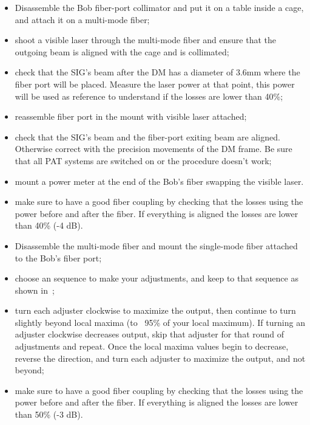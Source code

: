 \begin{itemize}
  \item Disassemble the Bob fiber-port collimator and put it on a table inside a cage, and attach it on a multi-mode fiber;
  \item shoot a visible laser through the multi-mode fiber and ensure that the outgoing beam is aligned with the cage and is collimated;
  \item check that the SIG's beam after the DM has a diameter of 3.6mm where the fiber port will be placed. Measure the laser power at that point, this power will be used as reference to understand if the losses are lower than 40\%;
  \item reassemble fiber port in the mount with visible laser attached;
  \item check that the SIG's beam and the fiber-port exiting beam are aligned. Otherwise correct with the precision movements of the DM frame. Be sure that all PAT systems are switched on or the procedure doesn't work;
  \item mount a power meter at the end of the Bob's fiber swapping the visible laser.
  \item make sure to have a good fiber coupling by checking that the losses using the power before and after the fiber. If everything is aligned the losses are lower than 40\% (-4 dB).
\end{itemize}

\begin{itemize}
  \item Disassemble the multi-mode fiber and mount the single-mode fiber attached to the Bob's fiber port;
  \item choose an sequence to make your adjustments, and keep to that sequence as shown in~;
  \item turn each adjuster clockwise to maximize the output, then continue to turn slightly beyond local maxima (to ~95\% of your local maximum). If turning an adjuster clockwise decreases output, skip that adjuster for that round of adjustments and repeat. Once the local maxima values begin to decrease, reverse the direction, and turn each adjuster to maximize the output, and not beyond;
  \item make sure to have a good fiber coupling by checking that the losses using the power before and after the fiber. If everything is aligned the losses are lower than 50\% (-3 dB).
\end{itemize}
